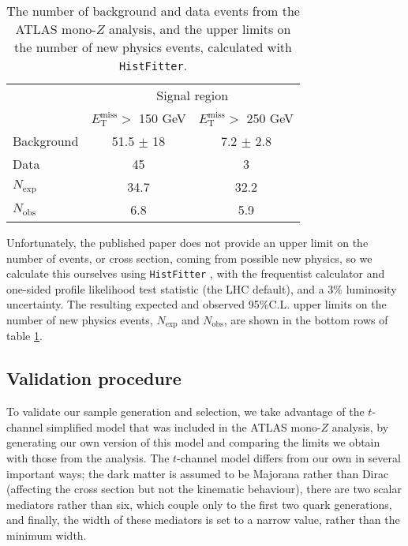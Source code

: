 \begin{flushleft}
\begin{table}
\begin{center}
\begin{tabular}{ l | c c }
\hline
\hline
& \multicolumn{2}{c}{Signal region} \\
& $E_{\mathrm{T}}^{\mathrm{miss}} >$ 150 GeV & $E_{\mathrm{T}}^{\mathrm{miss}} >$ 250 GeV \\
\hline
Background & 51.5 $\pm$ 18 & 7.2 $\pm$ 2.8 \\
Data & 45 & 3 \\
\hline
$N_{\mathrm{exp}}$ & 34.7 & 32.2 \\
$N_{\mathrm{obs}}$ & 6.8 & 5.9 \\ 
\hline
\end{tabular}
\end{center}
\caption{The number of background and data events from the ATLAS mono-$Z$ analysis, and the upper limits on the number of new physics events, calculated with \texttt{HistFitter}.}
\label{tab:MonoZPaperLims}
\end{table}

Unfortunately, the published paper does not provide an upper limit on the number of events, or cross section, coming from possible new physics, so we calculate this ourselves using \texttt{HistFitter} \cite{ATLASmonoZ}, with the frequentist calculator and one-sided profile likelihood test statistic (the LHC default), and a 3\% luminosity uncertainty. The resulting expected and observed 95\%C.L. upper limits on the number of new physics events, $N_{\mathrm{exp}}$ and $N_{\mathrm{obs}}$, are shown in the bottom rows of table \ref{tab:MonoZPaperLims}. 

\subsection{Validation procedure}

To validate our sample generation and selection, we take advantage of the $t$-channel simplified model that was included in the ATLAS mono-$Z$ analysis, by generating our own version of this model and comparing the limits we obtain with those from the analysis. The $t$-channel model differs from our own in several important ways; the dark matter is assumed to be Majorana rather than Dirac (affecting the cross section but not the kinematic behaviour), there are two scalar mediators rather than six, which couple only to the first two quark generations, and finally, the width of these mediators is set to a narrow value, rather than the minimum width.


\end{flushleft}
